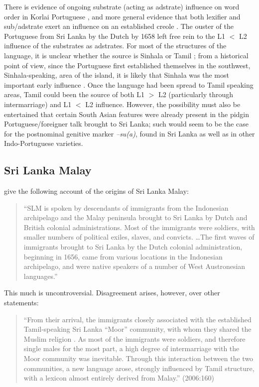 There is evidence of ongoing substrate (acting as adstrate) influence on word order in Korlai Portuguese \citep{Clements1991}, and more general evidence that both lexifier and sub/adstrate exert an influence on an established creole \citep{Clements2009,Smithfc}. The ouster of the Portuguese from Sri Lanka by the Dutch by 1658 left free rein to the L1 $<$ L2 influence of the substrates as adstrates. For most of the structures of the language, it is unclear whether the source is Sinhala or Tamil \citep[216]{Smith1979convergence}; from a historical point of view, since the Portuguese first established themselves in the southwest, Sinhala-speaking, area of the island, it is likely that Sinhala was the most important early influence \citep[cf.][254-5]{Jayasuriya1999substratum}. Once the language had been spread to Tamil speaking areas, Tamil could been the source of both L1 $>$ L2 (particularly through intermarriage) and L1 $<$ L2 influence. However, the possibility must also be entertained that certain South Asian features were already present in the pidgin Portuguese/foreigner talk brought to Sri Lanka; such would seem to be the case for the postnominal genitive marker \textit{{}--su(a)}, found in Sri Lanka as well as in other Indo-Portuguese varieties. 

\subsection{Sri Lanka Malay}

\citet{SmithEtAl2006cll} give the following account of the origins of Sri Lanka Malay:

\begin{quote}
``SLM is spoken by descendants of immigrants from the Indonesian archipelago and the Malay peninsula brought to Sri Lanka by Dutch and British colonial administrations. Most of the immigrants were soldiers, with smaller numbers of political exiles, slaves, and convicts. {\dots}The first waves of immigrants brought to Sri Lanka by the Dutch colonial administration, beginning in 1656, came from various locations in the Indonesian archipelago, and were native speakers of a number of West Austronesian languages.'' \citep[2006:160-1]{SmithEtAl2006cll}
\end{quote}

This much is uncontroversial. Disagreement arises, however, over other statements:

\begin{quote}
``From their arrival, the immigrants closely associated with the established Tamil-speaking Sri Lanka ``Moor'' community, with whom they shared the Muslim religion \citep[45]{Hussainmiya1987}. As most of the immigrants were soldiers, and therefore single males for the most part, a high degree of intermarriage with the Moor community was inevitable. Through this interaction between the two communities, a new language arose, strongly influenced by Tamil structure, with a lexicon almost entirely derived from Malay.'' (2006:160)
\end{quote}

